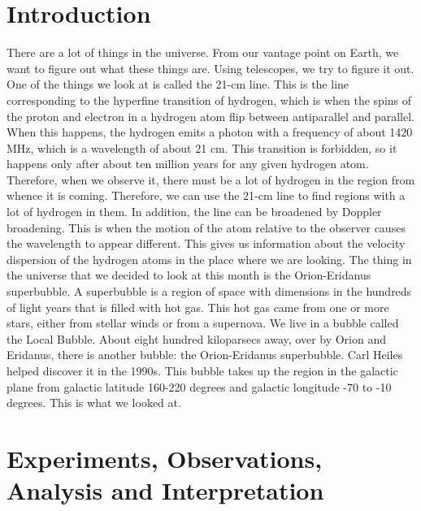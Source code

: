 \documentclass[11pt]{article}
\begin{document}
\section{Introduction}
There are a lot of things in the universe. From our vantage point on Earth, we want to figure out what these things are. Using telescopes, we try to figure it out. One of the things we look at is called the 21-cm line. This is the line corresponding to the hyperfine transition of hydrogen, which is when the spins of the proton and electron in a hydrogen atom flip between antiparallel and parallel. When this happens, the hydrogen emits a photon with a frequency of about 1420 MHz, which is a wavelength of about 21 cm. This transition is forbidden, so it happens only after about ten million years for any given hydrogen atom. Therefore, when we observe it, there must be a lot of hydrogen in the region from whence it is coming. Therefore, we can use the 21-cm line to find regions with a lot of hydrogen in them. In addition, the line can be broadened by Doppler broadening. This is when the motion of the atom relative to the observer causes the wavelength to appear different. This gives us information about the velocity dispersion of the hydrogen atoms in the place where we are looking. 
The thing in the universe that we decided to look at this month is the Orion-Eridanus superbubble. A superbubble is a region of space with dimensions in the hundreds of light years that is filled with hot gas. This hot gas came from one or more stars, either from stellar winds or from a supernova. We live in a bubble called the Local Bubble. About eight hundred kiloparsecs away, over by Orion and Eridanus, there is another bubble: the Orion-Eridanus superbubble. Carl Heiles helped discover it in the 1990s. This bubble takes up the region in the galactic plane from galactic latitude 160-220 degrees and galactic longitude -70 to -10 degrees. This is what we looked at.  

\section{Experiments, Observations, Analysis and Interpretation}
\end{document}
